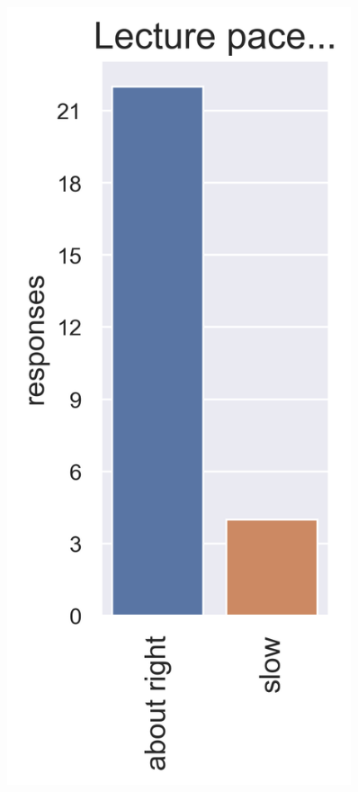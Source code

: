 \documentclass[aspectratio=169, handout]{beamer}
\begin{document}
\begin{frame}[t]

\begin{columns}

\begin{figure}
\includegraphics[width=0.9\textwidth]{survey_pace}
\caption*{}
\end{figure}


\end{columns}
\end{frame}
\end{document}
